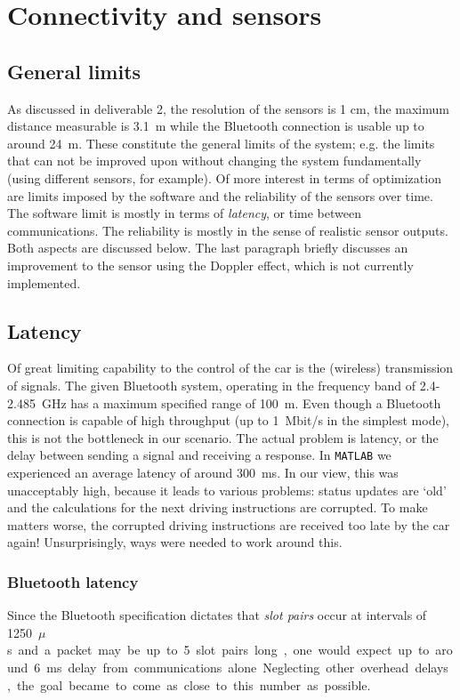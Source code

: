 \documentclass[11pt,titlepage]{report}
\begin{document}
\chapter{Connectivity and sensors}
\label{ch:anticollision}
\section{General limits}
As discussed in deliverable 2, the resolution of the sensors is 1 cm, the maximum distance measurable is \SI{3.1}{m} while the Bluetooth connection is usable up to around \SI{24}{m}. These constitute the general limits of the system; e.g. the limits that can not be improved upon without changing the system fundamentally (using different sensors, for example). Of more interest in terms of optimization are limits imposed by the software and the reliability of the sensors over time. The software limit is mostly in terms of \textit{latency}, or time between communications. The reliability is mostly in the sense of realistic sensor outputs. Both aspects are discussed below. The last paragraph briefly discusses an improvement to the sensor using the Doppler effect, which is not currently implemented.

\section{Latency}
Of great limiting capability to the control of the car is the (wireless) transmission of signals. The given Bluetooth system, operating in the frequency band of \num{2.4}-\SI{2.485}{GHz} has a maximum specified range of \SI{100}{m}.  Even though a Bluetooth connection is capable of high throughput (up to \SI{1}{Mbit/s} in the simplest mode), this is not the bottleneck in our scenario. The actual problem is latency, or the delay between sending a signal and receiving a response. In \texttt{MATLAB} we experienced an average latency of around \SI{300}{ms}. In our view, this was unacceptably high, because it leads to various problems: status updates are `old' and the calculations for the next driving instructions are corrupted. To make matters worse, the corrupted driving instructions are received too late by the car again! Unsurprisingly, ways were needed to work around this.
\subsection{Bluetooth latency}
Since the Bluetooth specification dictates that \textit{slot pairs} occur at intervals of \SI{1250}{$\mu$s} and a packet may be up to 5 slot pairs long, one would expect up to around \SI{6}{ms} delay from communications alone. Neglecting other overhead delays, the goal became to come as close to this number as possible. 
\end{document}

